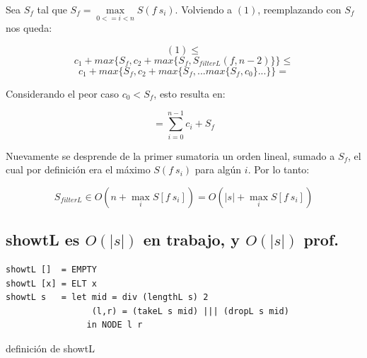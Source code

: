\documentclass[12pt]{article}
\begin{document}
\begin{itemize}
    Sea $S_f$ tal que $S_f = \max\limits_{0<=i<n} S(f\ s_i)$. 
    Volviendo a $(1)$, reemplazando con $S_f$ nos queda:

    $$ (1) \leq $$
    $$ c_1 + max\{ S_f, c_2 + max\{S_f, S_{filterL}(f, n-2) \} \} \leq $$
    $$ c_1 + max\{ S_f, c_2 + max\{S_f, ... max\{ S_f, c_0 \} ... \} \} = $$

    Considerando el peor caso $c_0 < S_f$, esto resulta en:

    $$ = \sum\limits_{i=0}^{n-1} c_i + S_f $$

    Nuevamente se desprende de la primer sumatoria un orden lineal, sumado a $S_f$, el cual por definición era el máximo $S(f\ s_i)$ para algún $i$. Por lo tanto:

    $$ S_{filterL} \in O(n + \max\limits_{i} S[f\ s_i] ) = O(|s| + \max\limits_{i} S[f\ s_i] ) $$
    
\end{itemize}


\subsection{showtL es $O(|s|)$ en trabajo, y $O(|s|)$ prof.}

\begin{table}[h]
\begin{lstlisting}
showtL []  = EMPTY
showtL [x] = ELT x
showtL s   = let mid = div (lengthL s) 2
                 (l,r) = (takeL s mid) ||| (dropL s mid)
                in NODE l r
\end{lstlisting}
\caption{definición de showtL}
\end{table}
\end{document}
